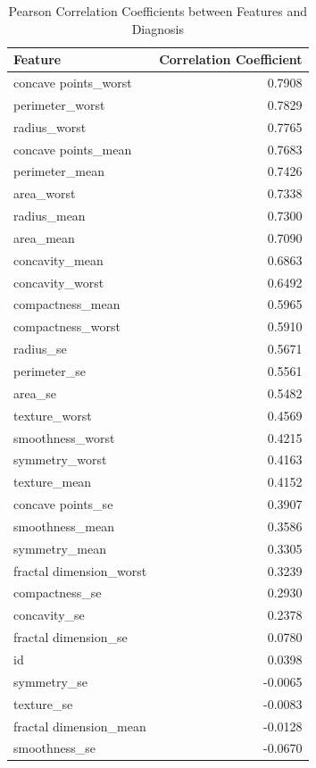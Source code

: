 \documentclass[a4paper,12pt]{article}
\begin{document}
\begin{table}
	\centering
	\begin{tabular}{l r}
		\hline
		\textbf{Feature} & \textbf{Correlation Coefficient} \\
		\hline
		concave points\_worst & 0.7908 \\
		perimeter\_worst & 0.7829 \\
		radius\_worst & 0.7765 \\
		concave points\_mean & 0.7683 \\
		perimeter\_mean & 0.7426 \\
		area\_worst & 0.7338 \\
		radius\_mean & 0.7300 \\
		area\_mean & 0.7090 \\
		concavity\_mean & 0.6863 \\
		concavity\_worst & 0.6492 \\
		compactness\_mean & 0.5965 \\
		compactness\_worst & 0.5910 \\
		radius\_se & 0.5671 \\
		perimeter\_se & 0.5561 \\
		area\_se & 0.5482 \\
		texture\_worst & 0.4569 \\
		smoothness\_worst & 0.4215 \\
		symmetry\_worst & 0.4163 \\
		texture\_mean & 0.4152 \\
		concave points\_se & 0.3907 \\
		smoothness\_mean & 0.3586 \\
		symmetry\_mean & 0.3305 \\
		fractal dimension\_worst & 0.3239 \\
		compactness\_se & 0.2930 \\
		concavity\_se & 0.2378 \\
		fractal dimension\_se & 0.0780 \\
		id & 0.0398 \\
		symmetry\_se & -0.0065 \\
		texture\_se & -0.0083 \\
		fractal dimension\_mean & -0.0128 \\
		smoothness\_se & -0.0670 \\
		\hline
	\end{tabular}
	\caption{Pearson Correlation Coefficients between Features and Diagnosis}
	\label{tab:correlation}
\end{table}
\end{document}

